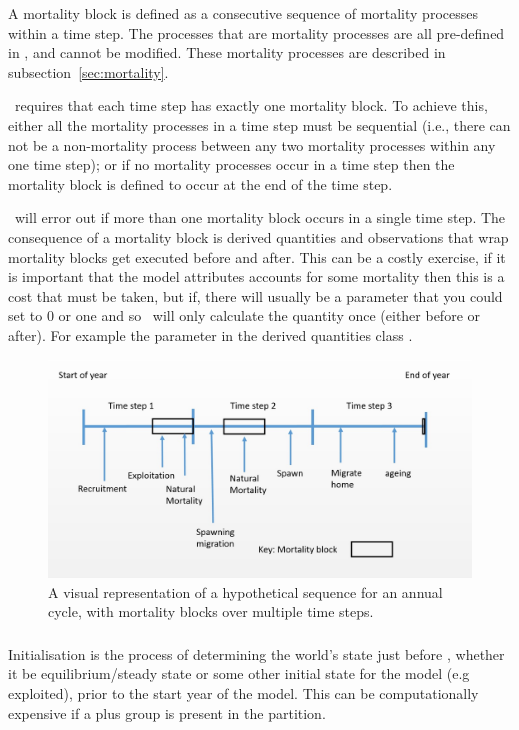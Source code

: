 A mortality block is defined as a consecutive sequence of mortality processes within a time step. The processes that are mortality processes are all pre-defined in \IBM, and cannot be modified. These mortality processes are described in subsection~\ref{sec:mortality}. 

\IBM\ requires that each time step has exactly one mortality block. To achieve this, either all the mortality processes in a time step must be sequential (i.e., there can not be a non-mortality process between any two mortality processes within any one time step); or if no mortality processes occur in a time step then the mortality block is defined to occur at the end of the time step. 

\IBM\ will error out if more than one mortality block occurs in a single time step. The consequence of a mortality block is derived quantities and observations that wrap mortality blocks get executed before and after. This can be a costly exercise, if it is important that the model attributes accounts for some mortality then this is a cost that must be taken, but if, there will usually be a parameter that you could set to 0 or one and so \IBM\ will only calculate the quantity once (either before or after). For example the parameter in the derived quantities class .

\begin{figure}[H]
	\centering
	\includegraphics[scale=0.5]{Figures/annual_cycle.jpg}
	\caption{A visual representation of a hypothetical sequence for an annual cycle, with mortality blocks over multiple time steps.}\label{Fig:annual}
\end{figure}

\subsubsection{}\label{subsec:initialisation}
Initialisation is the process of determining the world's state just before , whether it be equilibrium/steady state or some other initial state for the model (e.g exploited), prior to the start year of the model. This can be computationally expensive if a plus group is present in the partition.

